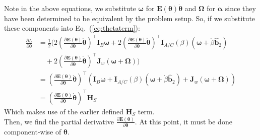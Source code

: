 \documentclass[titlepage]{article}
\begin{document}
Note in the above equations, we substitute $\boldsymbol{\omega}$ for $\boldsymbol{E}(\boldsymbol{\theta})\dot{\boldsymbol{\theta}}$ and $\boldsymbol{\Omega}$ for $\dot{\boldsymbol{\alpha}}$ since they have been determined to be equivalent by the problem setup. So, if we substitute these components into Eq.~(\ref{eq:thetaterm}):
\begin{equation}
	\begin{split}
		\frac{\partial L}{\partial\boldsymbol{\theta}}&=\frac{1}{2}\bigg(2\left(\frac{\partial\boldsymbol{E}(\boldsymbol{\theta})}{\partial\boldsymbol{\theta}}\dot{\boldsymbol{\theta}}\right)^\top\boldsymbol{I}_B\boldsymbol{\omega}+2\left(\frac{\partial\boldsymbol{E}(\boldsymbol{\theta})}{\partial\boldsymbol{\theta}}\dot{\boldsymbol{\theta}}\right)^\top\boldsymbol{I}_{A/C}(\beta)\left(\boldsymbol{\omega}+\dot{\beta}\hat{\boldsymbol{b}}_2\right) \\
		&\quad+2\left(\frac{\partial\boldsymbol{E}(\boldsymbol{\theta})}{\partial\boldsymbol{\theta}}\dot{\boldsymbol{\theta}}\right)^\top\boldsymbol{J}_w\left(\boldsymbol{\omega}+\boldsymbol{\Omega}\right)\bigg) \\
		&=\left(\frac{\partial\boldsymbol{E}(\boldsymbol{\theta})}{\partial\boldsymbol{\theta}}\dot{\boldsymbol{\theta}}\right)^\top\left(\boldsymbol{I}_B\boldsymbol{\omega}+\boldsymbol{I}_{A/C}(\beta)\left(\boldsymbol{\omega}+\dot{\beta}\hat{\boldsymbol{b}}_2\right)+\boldsymbol{J}_w\left(\boldsymbol{\omega}+\boldsymbol{\Omega}\right)\right) \\
		&=\left(\frac{\partial\boldsymbol{E}(\boldsymbol{\theta})}{\partial\boldsymbol{\theta}}\dot{\boldsymbol{\theta}}\right)^\top\boldsymbol{H}_S
	\end{split}
\end{equation}
Which makes use of the earlier defined $\boldsymbol{H}_S$ term.\\

Then, we find the partial derivative $\frac{\partial\boldsymbol{E}(\boldsymbol{\theta})}{\partial\boldsymbol{\theta}}$. At this point, it must be done component-wise of $\boldsymbol{\theta}$.\\
\end{document}
